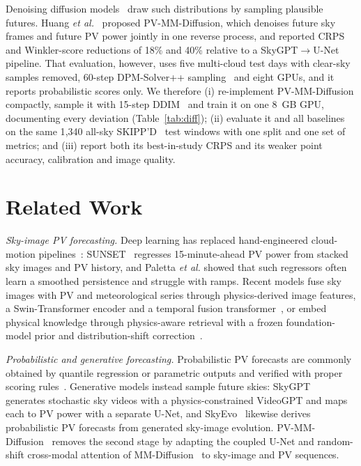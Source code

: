 \documentclass[conference]{IEEEtran}
\begin{document}
Denoising diffusion models~\cite{ho2020ddpm} draw such distributions by sampling plausible futures. Huang
\emph{et al.}~\cite{huang2026pvmm} proposed PV-MM-Diffusion, which denoises future sky frames and future PV power
jointly in one reverse process, and reported CRPS and Winkler-score reductions of 18\% and 40\% relative to a
SkyGPT$\rightarrow$U-Net pipeline. That evaluation, however, uses five multi-cloud test days with clear-sky samples
removed, 60-step DPM-Solver++ sampling~\cite{lu2022dpmsolverpp} and eight GPUs, and it reports probabilistic scores
only. We therefore (i) re-implement PV-MM-Diffusion compactly, sample it with 15-step DDIM~\cite{song2021ddim} and
train it on one 8~GB GPU, documenting every deviation (Table~\ref{tab:diff}); (ii) evaluate it and all baselines on
the same 1{,}340 all-sky SKIPP'D~\cite{nie2023skippd} test windows with one split and one set of metrics; and
(iii) report both its best-in-study CRPS and its weaker point accuracy, calibration and image quality.

\section{Related Work}
\textit{Sky-image PV forecasting.}
Deep learning has replaced hand-engineered cloud-motion pipelines~\cite{paletta2023advances}: SUNSET~\cite{sun2019sunset}
regresses 15-minute-ahead PV power from stacked sky images and PV history, and Paletta \emph{et al.}
\cite{paletta2021benchmarking} showed that such regressors often learn a smoothed persistence and struggle with ramps.
Recent models fuse sky images with PV and meteorological series through physics-derived image features, a
Swin-Transformer encoder and a temporal fusion transformer~\cite{jiang2026sft}, or embed physical knowledge through
physics-aware retrieval with a frozen foundation-model prior and distribution-shift correction~\cite{fan2026parapv}.

\textit{Probabilistic and generative forecasting.}
Probabilistic PV forecasts are commonly obtained by quantile regression or parametric outputs
\cite{vandermeer2018review} and verified with proper scoring rules~\cite{lauret2019verification}. Generative models
instead sample future skies: SkyGPT~\cite{nie2024skygpt} generates stochastic sky videos with a physics-constrained
VideoGPT and maps each to PV power with a separate U-Net, and SkyEvo~\cite{ruan2026skyevo} likewise derives
probabilistic PV forecasts from generated sky-image evolution. PV-MM-Diffusion~\cite{huang2026pvmm} removes the second
stage by adapting the coupled U-Net and random-shift cross-modal attention of MM-Diffusion~\cite{ruan2023mmdiffusion}
to sky-image and PV sequences.
\end{document}

